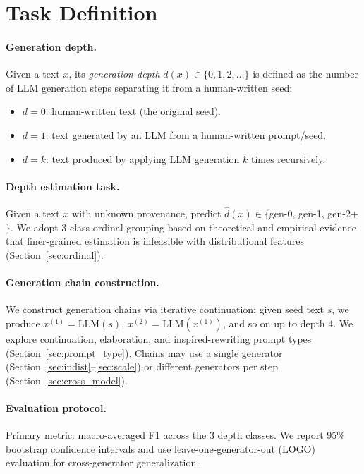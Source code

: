 \documentclass[11pt]{article}
\begin{document}
\section{Task Definition}
\label{sec:task}

\paragraph{Generation depth.}
Given a text $x$, its \emph{generation depth} $d(x) \in \{0, 1, 2, \ldots\}$ is defined as the number of LLM generation steps separating it from a human-written seed:
\begin{itemize}
  \item $d=0$: human-written text (the original seed).
  \item $d=1$: text generated by an LLM from a human-written prompt/seed.
  \item $d=k$: text produced by applying LLM generation $k$ times recursively.
\end{itemize}

\paragraph{Depth estimation task.}
Given a text $x$ with unknown provenance, predict $\hat{d}(x) \in \{$gen-0, gen-1, gen-2+$\}$.
We adopt 3-class ordinal grouping based on theoretical and empirical evidence that finer-grained estimation is infeasible with distributional features (Section~\ref{sec:ordinal}).

\paragraph{Generation chain construction.}
We construct generation chains via iterative continuation: given seed text $s$, we produce $x^{(1)} = \text{LLM}(s)$, $x^{(2)} = \text{LLM}(x^{(1)})$, and so on up to depth 4.
We explore continuation, elaboration, and inspired-rewriting prompt types (Section~\ref{sec:prompt_type}).
Chains may use a single generator (Section~\ref{sec:indist}--\ref{sec:scale}) or different generators per step (Section~\ref{sec:cross_model}).

\paragraph{Evaluation protocol.}
Primary metric: macro-averaged F1 across the 3 depth classes.
We report 95\% bootstrap confidence intervals and use leave-one-generator-out (LOGO) evaluation for cross-generator generalization.
\end{document}
